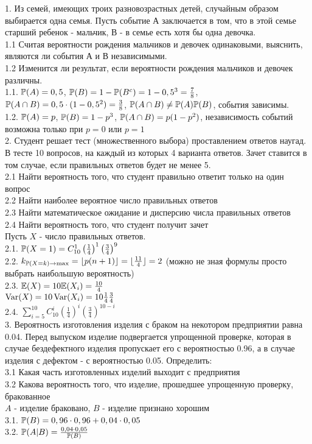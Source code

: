 \documentclass[pdftex,12pt,a4paper]{article}
\begin{document}
1.  Из семей, имеющих троих разновозрастных детей, случайным
образом выбирается одна семья. Пусть событие А заключается в том,
что в этой семье
старший ребенок - мальчик, В - в семье есть хотя бы одна девочка. \\
1.1 Считая вероятности рождения мальчиков и девочек одинаковыми,
выяснить, являются ли события А и В независимыми. \\
1.2 Изменится ли результат, если вероятности рождения мальчиков и
девочек различны. \\
1.1. $\P(A)=0,5$, $\P(B)=1-\P(B^{c})=1-0,5^{3}=\frac{7}{8}$, $\P(A\cap
B)=0,5\cdot (1-0,5^{2})=\frac{3}{8}$, $\P(A\cap B)\neq \P(A)\P(B)$,
события зависимы. \\
1.2. $\P(A)=p$, $\P(B)=1-p^{3}$, $\P(A\cap B)=p(1-p^{2})$,
независимость событий возможна только при $p=0$ или $p=1$ \\

2.  Студент решает тест (множественного выбора) проставлением
ответов наугад. В тесте 10 вопросов, на каждый из которых 4
варианта ответов. Зачет ставится в том случае, если правильных
ответов будет не менее 5. \\
2.1 Найти вероятность того, что студент правильно ответит только
на один вопрос \\
2.2 Найти наиболее вероятное число правильных ответов \\
2.3 Найти математическое ожидание и дисперсию числа правильных
ответов \\
2.4 Найти вероятность того, что студент получит зачет \\
Пусть $X$ - число правильных ответов. \\
2.1. $\P(X=1)=C_{10}^{1}\left(\frac{1}{4}\right)^{1}\left(\frac{3}{4}\right)^{9}$ \\
2.2. $k_{\P(X=k)\rightarrow \max}=\lfloor p(n+1)\rfloor=\lfloor
\frac{11}{4}\rfloor=2$ (можно не зная формулы просто выбрать
наибольшую вероятность) \\
2.3. $\E(X)=10\E(X_{i})=\frac{10}{4}$ \\
$\Var(X)=10\Var(X_{i})=10\frac{1}{4}\frac{3}{4}$ \\
2.4.
$\sum_{i=5}^{10}C_{10}^{i}\left(\frac{1}{4}\right)^{i}\left(\frac{3}{4}\right)^{10-i}$
\\

3.  Вероятность изготовления изделия с браком на некотором
предприятии равна 0.04. Перед выпуском изделие подвергается
упрощенной проверке, которая в случае бездефектного изделия
пропускает его с вероятностью 0.96, а в случае изделия с дефектом
- с вероятностью 0.05. Определить: \\
3.1 Какая часть изготовленных изделий выходит с предприятия \\
3.2 Какова вероятность того, что изделие, прошедшее упрощенную
проверку, бракованное \\
$A$ - изделие браковано, $B$ - изделие признано хорошим \\
3.1. $\P(B)=0,96\cdot 0,96+0,04\cdot 0,05$ \\
3.2. $\P(A|B)=\frac{0,04\cdot 0,05}{\P(B)}$ \\
\end{document}
